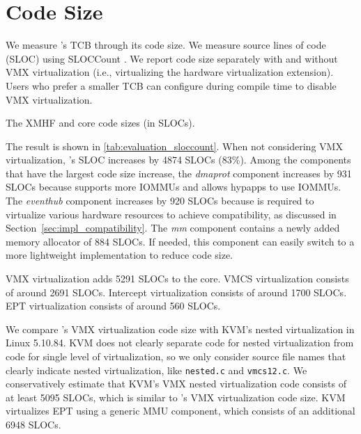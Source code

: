 \section{Code Size}
\label{sec:evaluation_sloccount}

We measure 's TCB through its code size. We measure source lines of code (SLOC) using SLOCCount \cite{wheeler2001sloccount}. We report code size separately with and without VMX virtualization (i.e., virtualizing the hardware virtualization extension). Users who prefer a smaller TCB can configure  during compile time to disable VMX virtualization.

\begin{table}[tbp]
	\begin{center}
	
	\caption{The XMHF and  core code sizes (in SLOCs).}
	\label{tab:evaluation_sloccount}
	\end{center}
\end{table}

The result is shown in \ref{tab:evaluation_sloccount}. When not considering VMX virtualization, 's SLOC increases by 4874 SLOCs (83\%). Among the components that have the largest code size increase, the \textit{dmaprot} component increases by 931 SLOCs because  supports more IOMMUs and allows hypapps to use IOMMUs. The \textit{eventhub} component increases by 920 SLOCs because  is required to virtualize various hardware resources to achieve compatibility, as discussed in Section~\ref{sec:impl_compatibility}. The \textit{mm} component contains a newly added memory allocator of 884 SLOCs. If needed, this component can easily switch to a more lightweight implementation to reduce code size.

VMX virtualization adds 5291 SLOCs to the  core. VMCS virtualization consists of around 2691 SLOCs. Intercept virtualization consists of around 1700 SLOCs. EPT virtualization consists of around 560 SLOCs.

We compare 's VMX virtualization code size with KVM's nested virtualization in Linux 5.10.84. KVM does not clearly separate code for nested virtualization from code for single level of virtualization, so we only consider source file names that clearly indicate nested virtualization, like \lstinline{nested.c} and \lstinline{vmcs12.c}. We conservatively estimate that KVM's VMX nested virtualization code consists of at least 5095 SLOCs, which is similar to 's VMX virtualization code size. KVM virtualizes EPT using a generic MMU component, which consists of an additional 6948 SLOCs.

